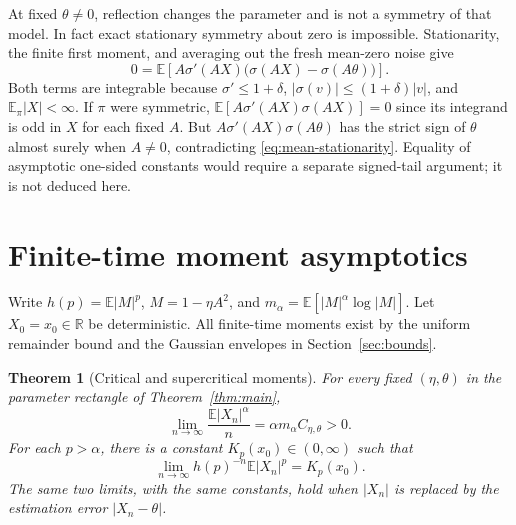 \documentclass[11pt,a4paper]{article}
\numberwithin{equation}{section}
\newtheorem{theorem}{Theorem}[section]
\theoremstyle{remark}
\newcommand{\E}{\mathbb E}
\newcommand{\R}{\mathbb R}
\begin{document}
At fixed $\theta\ne0$, reflection changes the parameter and is not a
symmetry of that model. In fact exact stationary symmetry about zero is
impossible. Stationarity, the finite first moment, and averaging out the
fresh mean-zero noise give
\begin{equation}
 0=\E\!\left[A\sigma'(AX)
                   \bigl(\sigma(AX)-\sigma(A\theta)\bigr)\right].
 \label{eq:mean-stationarity}
\end{equation}
Both terms are integrable because $\sigma'\le1+\delta$,
$|\sigma(v)|\le(1+\delta)|v|$, and $\E_\pi|X|<\infty$.
If $\pi$ were symmetric, $\E[A\sigma'(AX)\sigma(AX)]=0$ since its
integrand is odd in $X$ for each fixed $A$. But
$A\sigma'(AX)\sigma(A\theta)$ has the strict sign of $\theta$ almost
surely when $A\ne0$, contradicting \eqref{eq:mean-stationarity}.
Equality of asymptotic one-sided constants would require a separate
signed-tail argument; it is not deduced here.

\section{Finite-time moment asymptotics}\label{sec:growth}

Write $h(p)=\E|M|^p$, $M=1-\eta A^2$, and
$m_\alpha=\E[|M|^\alpha\log|M|]$. Let $X_0=x_0\in\R$ be
deterministic. All finite-time moments exist by the uniform remainder
bound and the Gaussian envelopes in Section~\ref{sec:bounds}.

\begin{theorem}[Critical and supercritical moments]\label{thm:growth}
For every fixed $(\eta,\theta)$ in the parameter rectangle of
Theorem~\ref{thm:main},
\[
 \lim_{n\to\infty}\frac{\E|X_n|^\alpha}{n}
 =\alpha m_\alpha C_{\eta,\theta}>0.
\]
For each $p>\alpha$, there is a constant $K_p(x_0)\in(0,\infty)$ such that
\[
 \lim_{n\to\infty}h(p)^{-n}\E|X_n|^p=K_p(x_0).
\]
The same two limits, with the same constants, hold when $|X_n|$ is
replaced by the estimation error $|X_n-\theta|$.
\end{theorem}
\end{document}
